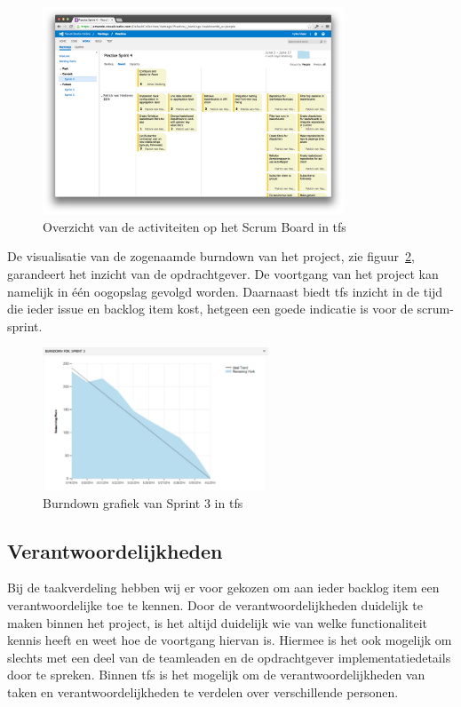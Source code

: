 \begin{figure}[H]
  \begin{center}
    \includegraphics[width=0.8\textwidth]{style/images/screenshots/ScrumBoard}
  \end{center}
  \caption{Overzicht van de activiteiten op het Scrum Board in \ac{tfs}}
  \label{fig:scrum-board}
\end{figure}

De visualisatie van de zogenaamde burndown van het project, zie figuur~\ref{fig:scrum-burndown}, garandeert het inzicht van de opdrachtgever. De voortgang van het project kan namelijk in één oogopslag gevolgd worden. Daarnaast biedt \ac{tfs} inzicht in de tijd die ieder issue en backlog item kost, hetgeen een goede indicatie is voor de scrum-sprint. 

\begin{figure}[H]
  \begin{center}
    \includegraphics[width=0.6\textwidth]{style/images/screenshots/Burndown}
  \end{center}
  \caption{Burndown grafiek van Sprint 3 in \ac{tfs}}
  \label{fig:scrum-burndown}
\end{figure}

\subsection{Verantwoordelijkheden}
Bij de taakverdeling hebben wij er voor gekozen om aan ieder backlog item een verantwoordelijke toe te kennen. Door de verantwoordelijkheden duidelijk te maken binnen het project, is het altijd duidelijk wie van welke functionaliteit kennis heeft en weet hoe de voortgang hiervan is. Hiermee is het ook mogelijk om slechts met een deel van de teamleaden en de opdrachtgever implementatiedetails door te spreken. Binnen \ac{tfs} is het mogelijk om de verantwoordelijkheden van taken en verantwoordelijkheden te verdelen over verschillende personen.

